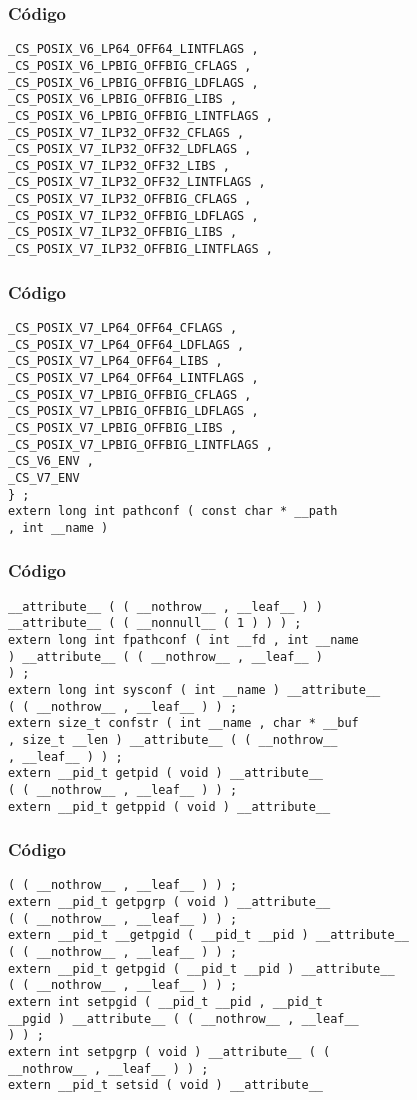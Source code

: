 \documentclass{beamer}
\begin{document}
\begin{frame}[fragile]
\frametitle{C\'odigo}
\begin{verbatim}
_CS_POSIX_V6_LP64_OFF64_LINTFLAGS , 
_CS_POSIX_V6_LPBIG_OFFBIG_CFLAGS , 
_CS_POSIX_V6_LPBIG_OFFBIG_LDFLAGS , 
_CS_POSIX_V6_LPBIG_OFFBIG_LIBS , 
_CS_POSIX_V6_LPBIG_OFFBIG_LINTFLAGS , 
_CS_POSIX_V7_ILP32_OFF32_CFLAGS , 
_CS_POSIX_V7_ILP32_OFF32_LDFLAGS , 
_CS_POSIX_V7_ILP32_OFF32_LIBS , 
_CS_POSIX_V7_ILP32_OFF32_LINTFLAGS , 
_CS_POSIX_V7_ILP32_OFFBIG_CFLAGS , 
_CS_POSIX_V7_ILP32_OFFBIG_LDFLAGS , 
_CS_POSIX_V7_ILP32_OFFBIG_LIBS , 
_CS_POSIX_V7_ILP32_OFFBIG_LINTFLAGS , 
\end{verbatim}
\end{frame}
\begin{frame}[fragile]
\frametitle{C\'odigo}
\begin{verbatim}
_CS_POSIX_V7_LP64_OFF64_CFLAGS , 
_CS_POSIX_V7_LP64_OFF64_LDFLAGS , 
_CS_POSIX_V7_LP64_OFF64_LIBS , 
_CS_POSIX_V7_LP64_OFF64_LINTFLAGS , 
_CS_POSIX_V7_LPBIG_OFFBIG_CFLAGS , 
_CS_POSIX_V7_LPBIG_OFFBIG_LDFLAGS , 
_CS_POSIX_V7_LPBIG_OFFBIG_LIBS , 
_CS_POSIX_V7_LPBIG_OFFBIG_LINTFLAGS , 
_CS_V6_ENV , 
_CS_V7_ENV 
} ; 
extern long int pathconf ( const char * __path 
, int __name ) 
\end{verbatim}
\end{frame}
\begin{frame}[fragile]
\frametitle{C\'odigo}
\begin{verbatim}
__attribute__ ( ( __nothrow__ , __leaf__ ) ) 
__attribute__ ( ( __nonnull__ ( 1 ) ) ) ; 
extern long int fpathconf ( int __fd , int __name 
) __attribute__ ( ( __nothrow__ , __leaf__ ) 
) ; 
extern long int sysconf ( int __name ) __attribute__ 
( ( __nothrow__ , __leaf__ ) ) ; 
extern size_t confstr ( int __name , char * __buf 
, size_t __len ) __attribute__ ( ( __nothrow__ 
, __leaf__ ) ) ; 
extern __pid_t getpid ( void ) __attribute__ 
( ( __nothrow__ , __leaf__ ) ) ; 
extern __pid_t getppid ( void ) __attribute__ 
\end{verbatim}
\end{frame}
\begin{frame}[fragile]
\frametitle{C\'odigo}
\begin{verbatim}
( ( __nothrow__ , __leaf__ ) ) ; 
extern __pid_t getpgrp ( void ) __attribute__ 
( ( __nothrow__ , __leaf__ ) ) ; 
extern __pid_t __getpgid ( __pid_t __pid ) __attribute__ 
( ( __nothrow__ , __leaf__ ) ) ; 
extern __pid_t getpgid ( __pid_t __pid ) __attribute__ 
( ( __nothrow__ , __leaf__ ) ) ; 
extern int setpgid ( __pid_t __pid , __pid_t 
__pgid ) __attribute__ ( ( __nothrow__ , __leaf__ 
) ) ; 
extern int setpgrp ( void ) __attribute__ ( ( 
__nothrow__ , __leaf__ ) ) ; 
extern __pid_t setsid ( void ) __attribute__ 
\end{verbatim}
\end{frame}
\end{document}

